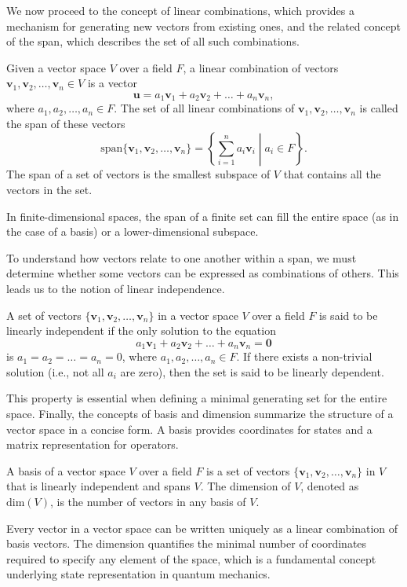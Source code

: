 We now proceed to the concept of linear combinations, which provides a mechanism for generating new vectors from existing ones, and the related concept of the span, which describes the set of all such combinations.
\begin{definition}
Given a vector space $V$ over a field $F$, a linear combination of vectors $\symbf{v}_1,\symbf{v}_2,\ldots,\symbf{v}_n\in V$ is a vector
\begin{equation}
\symbf{u}=a_1\symbf{v}_1+a_2\symbf{v}_2+\ldots+a_n\symbf{v}_n,
\end{equation}
where $a_1,a_2,\ldots,a_n\in F$. The set of all linear combinations of ${\symbf{v}_1,\symbf{v}_2,\ldots,\symbf{v}_n}$ is called the span of these vectors
\begin{equation}
\text{span}\lbrace\symbf{v}_1,\symbf{v}_2,\ldots,\symbf{v}_n\rbrace=\left\lbrace\sum_{i=1}^n a_i\symbf{v}_i\middle\vert a_i\in F\right\rbrace.
\end{equation}
The span of a set of vectors is the smallest subspace of $V$ that contains all the vectors in the set.
\end{definition}
In finite-dimensional spaces, the span of a finite set can fill the entire space (as in the case of a basis) or a lower-dimensional subspace.

To understand how vectors relate to one another within a span, we must determine whether some vectors can be expressed as combinations of others. This leads us to the notion of linear independence.
\begin{definition}
A set of vectors $\lbrace\symbf{v}_1,\symbf{v}_2,\ldots,\symbf{v}_n\rbrace$ in a vector space $V$ over a field $F$ is said to be linearly independent if the only solution to the equation
\begin{equation}
a_1\symbf{v}_1+a_2\symbf{v}_2+\ldots+a_n\symbf{v}_n=\symbf{0}
\end{equation}
is $a_1=a_2=\ldots=a_n=0$, where $a_1,a_2,\ldots,a_n\in F$. If there exists a non-trivial solution (i.e., not all $a_i$ are zero), then the set is said to be linearly dependent.
\end{definition}
This property is essential when defining a minimal generating set for the entire space. Finally, the concepts of basis and dimension summarize the structure of a vector space in a concise form. A basis provides coordinates for states and a matrix representation for operators.
\begin{definition}[Basis]
A basis of a vector space $V$ over a field $F$ is a set of vectors $\lbrace\symbf{v}_1,\symbf{v}_2,\ldots,\symbf{v}_n\rbrace$ in $V$ that is linearly independent and spans $V$. The dimension of $V$, denoted as $\text{dim}(V)$, is the number of vectors in any basis of $V$.
\end{definition}
Every vector in a vector space can be written uniquely as a linear combination of basis vectors. The dimension quantifies the minimal number of coordinates required to specify any element of the space, which is a fundamental concept underlying state representation in quantum mechanics.
